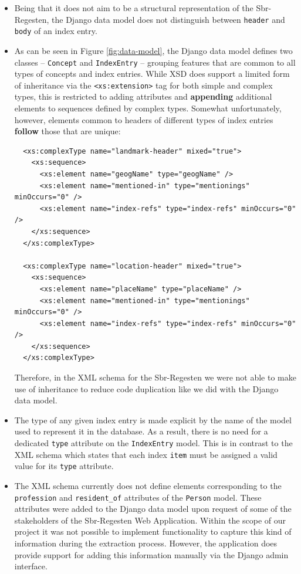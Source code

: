 \begin{itemize}
\item Being that it does not aim to be a structural representation of
  the Sbr-Regesten, the Django data model does not distinguish between
  \texttt{header} and \texttt{body} of an index entry.
\item As can be seen in Figure \ref{fig:data-model}, the Django data
  model defines two classes -- \texttt{Concept} and
  \texttt{IndexEntry} -- grouping features that are common to all
  types of concepts and index entries. While XSD does support a
  limited form of inheritance via the \texttt{<xs:extension>} tag for
  both simple and complex types, this is restricted to adding
  attributes and \textbf{appending} additional elements to sequences
  defined by complex types. Somewhat unfortunately, however, elements
  common to headers of different types of index entries
  \textbf{follow} those that are unique:

\begin{verbatim}
  <xs:complexType name="landmark-header" mixed="true">
    <xs:sequence>
      <xs:element name="geogName" type="geogName" />
      <xs:element name="mentioned-in" type="mentionings" minOccurs="0" />
      <xs:element name="index-refs" type="index-refs" minOccurs="0" />
    </xs:sequence>
  </xs:complexType>

  <xs:complexType name="location-header" mixed="true">
    <xs:sequence>
      <xs:element name="placeName" type="placeName" />
      <xs:element name="mentioned-in" type="mentionings" minOccurs="0" />
      <xs:element name="index-refs" type="index-refs" minOccurs="0" />
    </xs:sequence>
  </xs:complexType>
\end{verbatim}

  Therefore, in the XML schema for the Sbr-Regesten we were not able
  to make use of inheritance to reduce code duplication like we did
  with the Django data model.
\item The type of any given index entry is made explicit by the name
  of the model used to represent it in the database. As a result,
  there is no need for a dedicated \texttt{type} attribute on the
  \texttt{IndexEntry} model. This is in contrast to the XML schema
  which states that each index \texttt{item} must be assigned a valid
  value for its \texttt{type} attribute.
\item The XML schema currently does not define elements corresponding
  to the \texttt{profession} and \texttt{resident\_of} attributes of
  the \texttt{Person} model. These attributes were added to the Django
  data model upon request of some of the stakeholders of the
  Sbr-Regesten Web Application. Within the scope of our project it was
  not possible to implement functionality to capture this kind of
  information during the extraction process. However, the application
  does provide support for adding this information manually via the
  Django admin interface.
\end{itemize}

